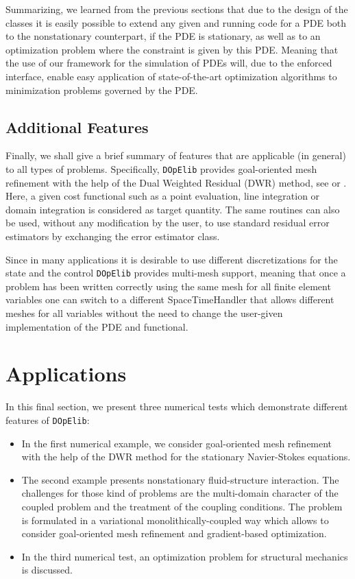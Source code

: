 \documentclass[smallextended]{svjour3}       %
\numberwithin{equation}{section}
\newcommand{\dope}{\texttt{DOpElib}}
\begin{document}
Summarizing, we learned from the previous sections 
that 
due to the design of the classes it is easily possible to extend any given 
and running code for a PDE both to the nonstationary counterpart, if the PDE is 
stationary, as well as to an optimization problem where the constraint is 
given by this PDE. Meaning that the use of our framework for the simulation of 
PDEs will, due to the enforced interface, enable easy application of state-of-the-art 
optimization algorithms to minimization problems governed by the PDE.


\subsection{Additional Features}\label{sec:additional}
Finally, we shall give a brief summary of features 
that are applicable (in general) to all types of problems. Specifically,
\dope{} provides goal-oriented mesh refinement with the help of the 
Dual Weighted Residual (DWR) method, see \cite{BeRa96} or \cite{BR03}. Here, a 
given cost functional such as a point evaluation, line integration or domain
integration is considered as target quantity. 
The same routines 
can also be used, without any modification by the user, to use standard 
residual error estimators by exchanging the 
error estimator class.

Since in many applications it is desirable to use different discretizations
for the state and the control \dope{} provides multi-mesh support, meaning that
once a problem has been written correctly using the same mesh for all finite element
variables one can switch to a different SpaceTimeHandler that allows different meshes for all 
variables without the need to change the user-given implementation of the PDE and functional.

\section{Applications}
\label{applications}
In this final section, 
we present three numerical tests which demonstrate different
features of \dope{}:
\begin{itemize}
\item In the first numerical example, we consider 
goal-oriented mesh refinement with the help of the 
DWR method for the stationary Navier-Stokes equations.
\item The second example presents nonstationary fluid-structure 
interaction. The challenges for those kind of problems are the multi-domain
character of the coupled problem and the treatment of the coupling conditions.
The problem is formulated in a variational monolithically-coupled way which 
allows to consider goal-oriented mesh refinement and gradient-based optimization.
\item In the third numerical test, an optimization problem for structural mechanics
is discussed.
\end{itemize}
\end{document}
